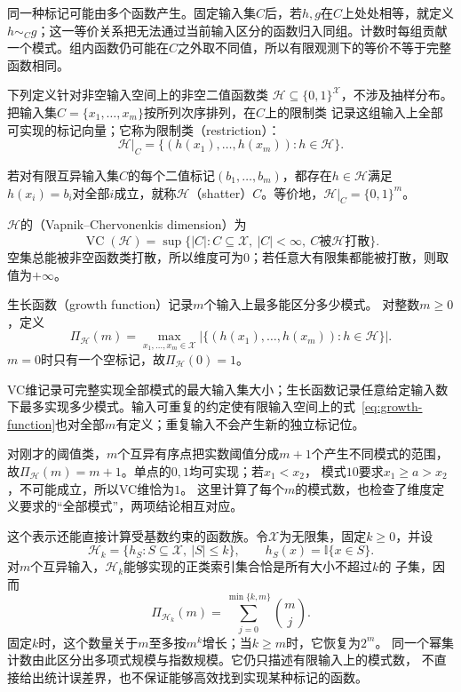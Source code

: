 同一种标记可能由多个函数产生。固定输入集$C$后，若$h,g$在$C$上处处相等，就定义$h\sim_Cg$；这一等价关系把无法通过当前输入区分的函数归入同组。计数时每组贡献一个模式。组内函数仍可能在$C$之外取不同值，所以有限观测下的等价不等于完整函数相同。

下列定义针对非空输入空间上的非空二值函数类
\(\mathcal H\subseteq\{0,1\}^{\mathcal X}\)，不涉及抽样分布。
把输入集\(C=\{x_1,\ldots,x_m\}\)按所列次序排列，在\(C\)上的限制类
记录这组输入上全部可实现的标记向量；它称为限制类（restriction）：
\[
  \mathcal H|_C=\{(h(x_1),\ldots,h(x_m)):h\in\mathcal H\}.
\]
\begin{definition}[打散]
  \label{def:shattering}
  若对有限互异输入集\(C\)的每个二值标记\((b_1,\ldots,b_m)\)，都存在\(h\in\mathcal H\)满足\(h(x_i)=b_i\)对全部\(i\)成立，就称\(\mathcal H\)（shatter）\(C\)。等价地，\(\mathcal H|_C=\{0,1\}^m\)。
\end{definition}
\begin{definition}[VC维]
  \label{def:vc-dimension}
  \(\mathcal H\)的（Vapnik--Chervonenkis dimension）为
  \[
    \operatorname{VC}(\mathcal H)
    =\sup\{|C|:C\subseteq\mathcal X,\ |C|<\infty,\ C\text{被}\mathcal H\text{打散}\}.
  \]
  空集总能被非空函数类打散，所以维度可为\(0\)；若任意大有限集都能被打散，则取值为\(+\infty\)。
\end{definition}
\begin{definition}[生长函数]
  \label{def:growth-function}
  生长函数（growth function）记录$m$个输入上最多能区分多少模式。
  对整数\(m\geq0\)，定义
  \begin{equation}
    \Pi_{\mathcal H}(m)
    =\max_{x_1,\ldots,x_m\in\mathcal X}
    |\{(h(x_1),\ldots,h(x_m)):h\in\mathcal H\}|.
    \label{eq:growth-function}
  \end{equation}
  \(m=0\)时只有一个空标记，故\(\Pi_{\mathcal H}(0)=1\)。
\end{definition}
VC维记录可完整实现全部模式的最大输入集大小；生长函数记录任意给定输入数下最多实现多少模式。输入可重复的约定使有限输入空间上的式~\eqref{eq:growth-function}也对全部\(m\)有定义；重复输入不会产生新的独立标记位。

对刚才的阈值类，$m$个互异有序点把实数阈值分成$m+1$个产生不同模式的范围，
故$\Pi_{\mathcal H}(m)=m+1$。单点的$0,1$均可实现；若$x_1<x_2$，
模式$10$要求$x_1\geq a>x_2$，不可能成立，所以VC维恰为$1$。
这里计算了每个$m$的模式数，也检查了维度定义要求的“全部模式”，两项结论相互对应。

这个表示还能直接计算受基数约束的函数族。令$\mathcal{X}$为无限集，固定$k\geq0$，并设
\[
  \mathcal{H}_k
  =
  \{h_S:S\subseteq\mathcal{X},\ |S|\leq k\},
  \qquad
  h_S(x)=\mathbb{I}\{x\in S\}.
\]
对$m$个互异输入，$\mathcal{H}_k$能够实现的正类索引集合恰是所有大小不超过$k$的
子集，因而
\[
  \Pi_{\mathcal{H}_k}(m)
  =
  \sum_{j=0}^{\min\{k,m\}}\binom{m}{j}.
\]
固定$k$时，这个数量关于$m$至多按$m^k$增长；当$k\geq m$时，它恢复为$2^m$。
同一个幂集计数由此区分出多项式规模与指数规模。它仍只描述有限输入上的模式数，
不直接给出统计误差界，也不保证能够高效找到实现某种标记的函数。

